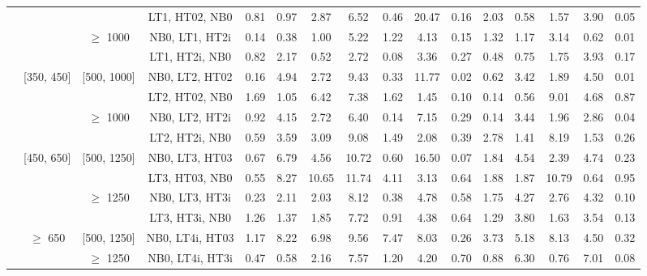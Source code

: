 \begin{sidewaystable}[ht]
\begin{center}
\begin{tabular}{|c | c | c | c | c | c | c | c | c | c | c | c | c | c | c | c | }
  &  &  &LT1, HT02, NB0 & 0.81 & 0.97 & 2.87 & 6.52 & 0.46 & 20.47 & 0.16 & 2.03 & 0.58 & 1.57 & 3.90 & 0.05 \\ 
\cline{3-16}  & & $\geq$ 1000 &NB0, LT1, HT2i & 0.14 & 0.38 & 1.00 & 5.22 & 1.22 & 4.13 & 0.15 & 1.32 & 1.17 & 3.14 & 0.62 & 0.01 \\ 
  &  &  &LT1, HT2i, NB0 & 0.82 & 2.17 & 0.52 & 2.72 & 0.08 & 3.36 & 0.27 & 0.48 & 0.75 & 1.75 & 3.93 & 0.17 \\ 
\cline{2-16}   & [350, 450] & [500, 1000]&NB0, LT2, HT02 & 0.16 & 4.94 & 2.72 & 9.43 & 0.33 & 11.77 & 0.02 & 0.62 & 3.42 & 1.89 & 4.50 & 0.01 \\ 
  &  &  &LT2, HT02, NB0 & 1.69 & 1.05 & 6.42 & 7.38 & 1.62 & 1.45 & 0.10 & 0.14 & 0.56 & 9.01 & 4.68 & 0.87 \\ 
\cline{3-16}  & & $\geq$ 1000 &NB0, LT2, HT2i & 0.92 & 4.15 & 2.72 & 6.40 & 0.14 & 7.15 & 0.29 & 0.14 & 3.44 & 1.96 & 2.86 & 0.04 \\ 
  &  &  &LT2, HT2i, NB0 & 0.59 & 3.59 & 3.09 & 9.08 & 1.49 & 2.08 & 0.39 & 2.78 & 1.41 & 8.19 & 1.53 & 0.26 \\ 
\cline{2-16}   & [450, 650] & [500, 1250]&NB0, LT3, HT03 & 0.67 & 6.79 & 4.56 & 10.72 & 0.60 & 16.50 & 0.07 & 1.84 & 4.54 & 2.39 & 4.74 & 0.23 \\ 
  &  &  &LT3, HT03, NB0 & 0.55 & 8.27 & 10.65 & 11.74 & 4.11 & 3.13 & 0.64 & 1.88 & 1.87 & 10.79 & 0.64 & 0.95 \\ 
\cline{3-16}  & & $\geq$ 1250 &NB0, LT3, HT3i & 0.23 & 2.11 & 2.03 & 8.12 & 0.38 & 4.78 & 0.58 & 1.75 & 4.27 & 2.76 & 4.32 & 0.10 \\ 
  &  &  &LT3, HT3i, NB0 & 1.26 & 1.37 & 1.85 & 7.72 & 0.91 & 4.38 & 0.64 & 1.29 & 3.80 & 1.63 & 3.54 & 0.13 \\ 
\cline{2-16}   & $\geq$ 650 & [500, 1250]&NB0, LT4i, HT03 & 1.17 & 8.22 & 6.98 & 9.56 & 7.47 & 8.03 & 0.26 & 3.73 & 5.18 & 8.13 & 4.50 & 0.32 \\ 
\cline{3-16}  & & $\geq$ 1250 &NB0, LT4i, HT3i & 0.47 & 0.58 & 2.16 & 7.57 & 1.20 & 4.20 & 0.70 & 0.88 & 6.30 & 0.76 & 7.01 & 0.08 \\ 
 \hline 
\hline 
\end{tabular} 
\end{center} 
\end{sidewaystable} 
 
